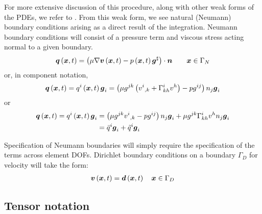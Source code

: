 For more extensive discussion of this procedure, along with other weak forms
of the PDEs, we refer to \cite{gresho:2000}. From this weak form, we see
natural (Neumann) boundary conditions arising as a direct result of the
integration. Neumann boundary conditions will consist of a pressure term and
viscous stress acting normal to a given boundary.
\begin{equation}
  \fnof{\vectr{q}}{\vectr{x},t} =
  \dotprod{\pbrac{\mu\gradient{}{\fnof{\vectr{v}}{\vectr{x},t}}-
      \fnof{p}{\vectr{x},t}\sharptensor{\vectr{g}}}}{\vectr{n}}  \quad\quad \vectr{x}\in\Gamma_{N}
  \label{eqn:NSENeumannBC}  
\end{equation}
or, in component notation,
\begin{equation}
   \boldsymbol{q}\left( \boldsymbol{x},t \right) = q^{i}\left( \boldsymbol{x},t \right) \boldsymbol{g}_{i}=
  \left( \mu
    g^{jk}\left(  {v^{i}}_{,k} + \Gamma^{i}_{kh} v^{h} \right)-pg^{ij} \right)n_{j}\boldsymbol{g}_{i}
\end{equation}
or
\begin{equation}
  \begin{split}
     \boldsymbol{q}\left( \boldsymbol{x},t \right) = q^{i}\left( \boldsymbol{x},t \right) \boldsymbol{g}_{i}&=\left( \mu
      g^{jk} {v^{i}}_{,k} -pg^{ij} \right)n_{j}\boldsymbol{g}_{i}+\mu
    g^{jk} \Gamma^{i}_{kh} v^{h}n_{j}\boldsymbol{g}_{i}\\
    &=\bar{q}^{i}\boldsymbol{g}_{i}+\tilde{q}^{i}\boldsymbol{g}_{i}
  \end{split}
\end{equation}

Specification of Neumann boundaries will simply require the specification of
the terms across element DOFs. Dirichlet boundary conditions on a boundary
$\Gamma_D$ for velocity will take the form:
\begin{gather}
  \fnof{\vectr{v}}{\vectr{x},t} = \fnof{\vectr{d}}{\vectr{x},t} \quad \vectr{x}\in\Gamma_{D}\\
  \label{eqn:NSEDirichletBC} 
\end{gather}

\subsection{Tensor notation}

